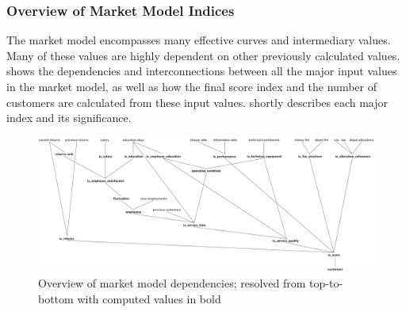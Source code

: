 \subsubsection{Overview of Market Model Indices}
The market model encompasses many effective curves and intermediary values. Many of these values are highly dependent on other previously calculated values.  shows the dependencies and interconnections between all the major input values in the market model, as well as how the final score index and the number of customers are calculated from these input values.  shortly describes each major index and its significance.

\begin{figure}[h!]
    \includegraphics[width=\textwidth]{img/market_model_dependencies.png}
    \caption{Overview of market model dependencies; resolved from top-to-bottom with computed values in bold}
    \centering
    \label{fig:market_model_dependencies}
\end{figure}

